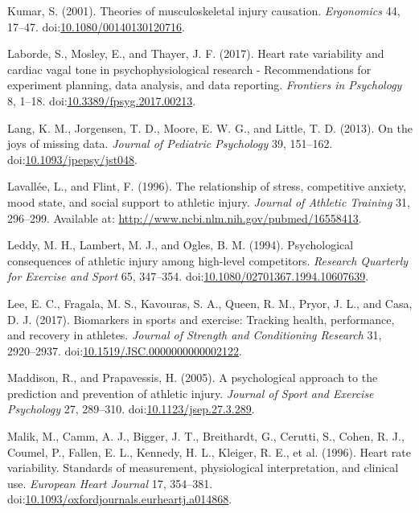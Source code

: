 \documentclass[
]{frontiersHLTH}
\newlength{\cslhangindent}
\newenvironment{cslreferences}%
  {\setlength{\parindent}{0pt}%
  \everypar{\setlength{\hangindent}{\cslhangindent}}\ignorespaces}%
  {\par}
\begin{document}
\begin{cslreferences}
\leavevmode\hypertarget{ref-Kumar2001}{}%
Kumar, S. (2001). Theories of musculoskeletal injury causation.
\emph{Ergonomics} 44, 17--47.
doi:\href{https://doi.org/10.1080/00140130120716}{10.1080/00140130120716}.

\leavevmode\hypertarget{ref-Laborde2017}{}%
Laborde, S., Mosley, E., and Thayer, J. F. (2017). Heart rate
variability and cardiac vagal tone in psychophysiological research -
Recommendations for experiment planning, data analysis, and data
reporting. \emph{Frontiers in Psychology} 8, 1--18.
doi:\href{https://doi.org/10.3389/fpsyg.2017.00213}{10.3389/fpsyg.2017.00213}.

\leavevmode\hypertarget{ref-Lang2014}{}%
Lang, K. M., Jorgensen, T. D., Moore, E. W. G., and Little, T. D.
(2013). On the joys of missing data. \emph{Journal of Pediatric
Psychology} 39, 151--162.
doi:\href{https://doi.org/10.1093/jpepsy/jst048}{10.1093/jpepsy/jst048}.

\leavevmode\hypertarget{ref-Lavallee1996}{}%
Lavallée, L., and Flint, F. (1996). The relationship of stress,
competitive anxiety, mood state, and social support to athletic injury.
\emph{Journal of Athletic Training} 31, 296--299. Available at:
\url{http://www.ncbi.nlm.nih.gov/pubmed/16558413}.

\leavevmode\hypertarget{ref-Leddy1994}{}%
Leddy, M. H., Lambert, M. J., and Ogles, B. M. (1994). Psychological
consequences of athletic injury among high-level competitors.
\emph{Research Quarterly for Exercise and Sport} 65, 347--354.
doi:\href{https://doi.org/10.1080/02701367.1994.10607639}{10.1080/02701367.1994.10607639}.

\leavevmode\hypertarget{ref-Lee2017}{}%
Lee, E. C., Fragala, M. S., Kavouras, S. A., Queen, R. M., Pryor, J. L.,
and Casa, D. J. (2017). Biomarkers in sports and exercise: Tracking
health, performance, and recovery in athletes. \emph{Journal of Strength
and Conditioning Research} 31, 2920--2937.
doi:\href{https://doi.org/10.1519/JSC.0000000000002122}{10.1519/JSC.0000000000002122}.

\leavevmode\hypertarget{ref-Maddison2005}{}%
Maddison, R., and Prapavessis, H. (2005). A psychological approach to
the prediction and prevention of athletic injury. \emph{Journal of Sport
and Exercise Psychology} 27, 289--310.
doi:\href{https://doi.org/10.1123/jsep.27.3.289}{10.1123/jsep.27.3.289}.

\leavevmode\hypertarget{ref-Malik1996}{}%
Malik, M., Camm, A. J., Bigger, J. T., Breithardt, G., Cerutti, S.,
Cohen, R. J., Coumel, P., Fallen, E. L., Kennedy, H. L., Kleiger, R. E.,
et al. (1996). Heart rate variability. Standards of measurement,
physiological interpretation, and clinical use. \emph{European Heart
Journal} 17, 354--381.
doi:\href{https://doi.org/10.1093/oxfordjournals.eurheartj.a014868}{10.1093/oxfordjournals.eurheartj.a014868}.


\end{cslreferences}
\end{document}
